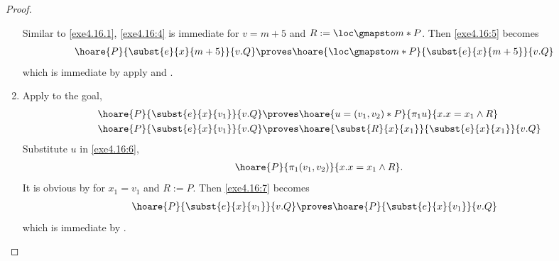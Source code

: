 \begin{proof}
\begin{enumerate}
      Similar to \ref{exe4.16.1}, \eqref{exe4.16:4} is immediate for
      $v = m + 5$ and $R := \loc \gmapsto m * P$. Then \eqref{exe4.16:5}
      becomes
      \begin{align*}
        \hoare{P}{\subst{e}{x}{m + 5}}{v.Q} \proves &
        \hoare{\loc \gmapsto m * P}{\subst{e}{x}{m + 5}}{v.Q}
      \end{align*}
      which is immediate by apply  and
      .

    \item Apply  to the goal,
      \begin{align}
        \hoare{P}{\subst{e}{x}{v_1}}{v.Q} \proves &
        \hoare{u = (v_1, v_2) * P}{\pi_1 u}{x.x = x_1 \wedge R} \label{exe4.16:6} \\
        \hoare{P}{\subst{e}{x}{v_1}}{v.Q} \proves &
        \hoare{\subst{R}{x}{x_1}}{\subst{e}{x}{x_1}}{v.Q} \label{exe4.16:7}
      \end{align}
      Substitute $u$ in \eqref{exe4.16:6},
      \begin{align*}
        \hoare{P}{\pi_1 (v_1, v_2)}{x.x = x_1 \wedge R}.
      \end{align*}
      It is obvious by  for $x_1 = v_1$ and $R := P$.
      Then \eqref{exe4.16:7} becomes
      \begin{align*}
        \hoare{P}{\subst{e}{x}{v_1}}{v.Q} \proves &
        \hoare{P}{\subst{e}{x}{v_1}}{v.Q}
      \end{align*}
      which is immediate by .
  \end{enumerate}
\end{proof}
